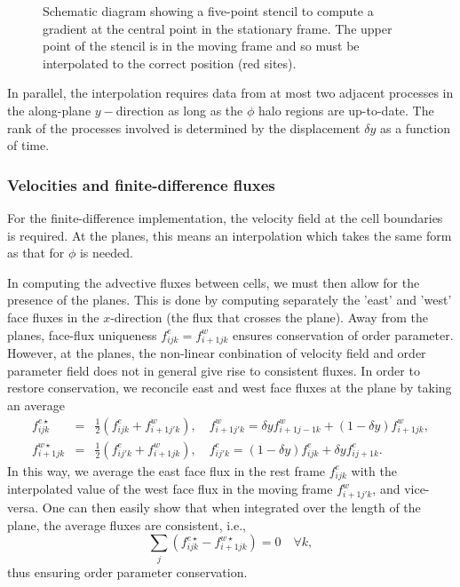 \begin{figure}[h]
\begin{center}
\end{center}
\caption{Schematic diagram showing a five-point stencil to compute a
gradient at the central point in the stationary frame. The upper point
of the stencil is in the moving frame and so must be interpolated to
the correct position (red sites).}
\label{fig_le3}
\end{figure}

In parallel, the interpolation requires data from at most two adjacent
processes in the along-plane $y-$direction as long as the $\phi$ halo
regions are up-to-date. The rank of the processes involved is
determined by the displacement $\delta y$ as a function of time.


\subsubsection{Velocities and finite-difference fluxes}

For the finite-difference implementation, the velocity field at
the cell boundaries is required. At the planes, this means an
interpolation which takes the same form as that for
$\phi$ is needed.

In computing the advective fluxes between cells, we must then
allow for the presence of the planes. This is done by computing
separately the 'east' and 'west' face fluxes in the $x$-direction
(the flux that crosses the plane). Away from the planes, face-flux
uniqueness $f_{ijk}^e = f_{i+1jk}^w$ ensures conservation of order
parameter. However, at the planes, the non-linear conbination of
velocity field and order parameter field does not in general give
rise to consistent fluxes. In order to restore conservation, we
reconcile east and west face fluxes at the plane by taking an
average
\begin{eqnarray}
f_{ijk}^{e\star}&=&{\textstyle\frac{1}{2}}(f_{ijk}^e + f_{i+1j'k}^w),\quad 
f_{i+1j'k}^w  = \delta y f_{i+1 j-1 k}^w + (1 - \delta y) f_{i+1jk}^w,\\
f_{i+1 j k}^{w\star} &=& {\textstyle\frac{1}{2}}(f_{ij'k}^e + f_{i+1jk}^w),\quad
f_{ij'k}^e = (1 - \delta y) f_{ijk}^e + \delta y f_{ij+1k}^e.
\end{eqnarray}
In this way, we average the east face flux in the rest frame $f_{ijk}^e$
with the interpolated value of the west face flux in the moving frame
$f_{i+1j'k}^w$, and vice-versa. One can then easily show that when
integrated over the length of the plane, the average fluxes are
consistent, i.e.,
\begin{equation}
\sum_j (f_{ijk}^{e\star} - f_{i+1jk}^{w\star}) = 0 \quad\forall k,
\end{equation}
thus ensuring order parameter conservation.

